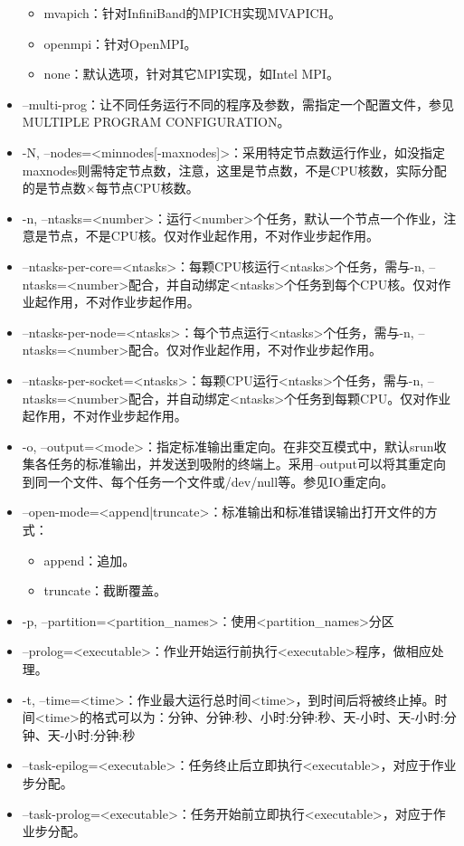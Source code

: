 \begin{itemize}
\begin{itemize}
	\item mvapich：针对InfiniBand的MPICH实现MVAPICH。
	\item openmpi：针对OpenMPI。
	\item none：默认选项，针对其它MPI实现，如Intel MPI。
\end{itemize}
\item --multi-prog：让不同任务运行不同的程序及参数，需指定一个配置文件，参见MULTIPLE PROGRAM CONFIGURATION。
\item -N, --nodes=<minnodes[-maxnodes]>：采用特定节点数运行作业，如没指定maxnodes则需特定节点数，注意，这里是节点数，不是CPU核数，实际分配的是节点数×每节点CPU核数。
\item -n, --ntasks=<number>：运行<number>个任务，默认一个节点一个作业，注意是节点，不是CPU核。仅对作业起作用，不对作业步起作用。
\item --ntasks-per-core=<ntasks>：每颗CPU核运行<ntasks>个任务，需与-n, --ntasks=<number>配合，并自动绑定<ntasks>个任务到每个CPU核。仅对作业起作用，不对作业步起作用。
\item --ntasks-per-node=<ntasks>：每个节点运行<ntasks>个任务，需与-n, --ntasks=<number>配合。仅对作业起作用，不对作业步起作用。
\item --ntasks-per-socket=<ntasks>：每颗CPU运行<ntasks>个任务，需与-n, --ntasks=<number>配合，并自动绑定<ntasks>个任务到每颗CPU。仅对作业起作用，不对作业步起作用。
\item -o, --output=<mode>：指定标准输出重定向。在非交互模式中，默认srun收集各任务的标准输出，并发送到吸附的终端上。采用--output可以将其重定向到同一个文件、每个任务一个文件或/dev/null等。参见IO重定向。
\item --open-mode=<append|truncate>：标准输出和标准错误输出打开文件的方式：
\begin{itemize}
	\item append：追加。
	\item truncate：截断覆盖。
\end{itemize}
\item -p, --partition=<partition\_names>：使用<partition\_names>分区
\item --prolog=<executable>：作业开始运行前执行<executable>程序，做相应处理。
\item -t, --time=<time>：作业最大运行总时间<time>，到时间后将被终止掉。时间<time>的格式可以为：分钟、分钟:秒、小时:分钟:秒、天-小时、天-小时:分钟、天-小时:分钟:秒
\item --task-epilog=<executable>：任务终止后立即执行<executable>，对应于作业步分配。
\item --task-prolog=<executable>：任务开始前立即执行<executable>，对应于作业步分配。

\end{itemize}
